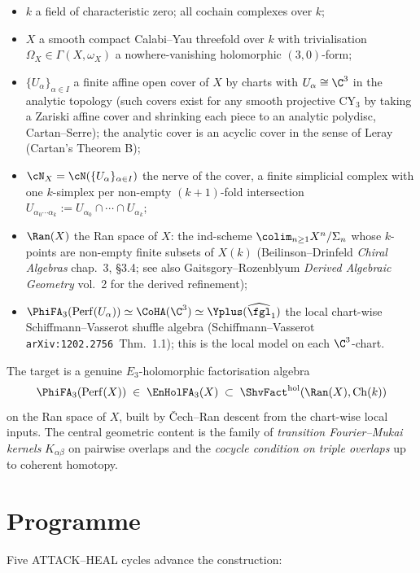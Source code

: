 \begin{itemize}
\item $k$ a field of characteristic zero; all cochain complexes over $k$;
\item $X$ a smooth compact Calabi--Yau threefold over $k$ with
  trivialisation $\Omega_X \in \Gamma(X, \omega_X)$ a nowhere-vanishing
  holomorphic $(3,0)$-form;
\item $\{U_\alpha\}_{\alpha \in I}$ a finite affine open cover of $X$
  by charts with $U_\alpha \cong \C^3$ in the analytic topology (such
  covers exist for any smooth projective CY$_3$ by taking a Zariski
  affine cover and shrinking each piece to an analytic polydisc,
  Cartan--Serre); the analytic cover is an acyclic cover in the sense
  of Leray (Cartan's Theorem B);
\item $\cN_X = \cN(\{U_\alpha\}_{\alpha \in I})$ the nerve of the
  cover, a finite simplicial complex with one $k$-simplex per
  non-empty $(k+1)$-fold intersection
  $U_{\alpha_0 \cdots \alpha_k} := U_{\alpha_0} \cap \cdots \cap
  U_{\alpha_k}$;
\item $\Ran(X)$ the Ran space of $X$: the ind-scheme
  $\colim_{n \geq 1} X^n / \Sigma_n$ whose $k$-points are non-empty
  finite subsets of $X(k)$ (Beilinson--Drinfeld \emph{Chiral Algebras}
  chap.~3, \S3.4; see also Gaitsgory--Rozenblyum \emph{Derived Algebraic
  Geometry} vol.~2 for the derived refinement);
\item $\PhiFA_3(\mathrm{Perf}(U_\alpha)) \simeq
  \CoHA(\C^3) \simeq \Yplus(\widehat{\fgl}_1)$ the local
  chart-wise Schiffmann--Vasserot shuffle algebra
  (Schiffmann--Vasserot \texttt{arXiv:1202.2756}~Thm.~1.1); this is
  the local model on each $\C^3$-chart.
\end{itemize}

The target is a genuine $E_3$-holomorphic factorisation algebra
\[
  \PhiFA_3(\mathrm{Perf}(X)) \;\in\; \EnHolFA_3(X) \;\subset\;
  \ShvFact^{\mathrm{hol}}(\Ran(X),\mathrm{Ch}(k))
\]
on the Ran space of $X$, built by \v{C}ech--Ran descent from the
chart-wise local inputs. The central geometric content is the family
of \emph{transition Fourier--Mukai kernels} $K_{\alpha\beta}$ on
pairwise overlaps and the \emph{cocycle condition on triple overlaps}
up to coherent homotopy.

\section*{Programme}

Five ATTACK--HEAL cycles advance the construction:

